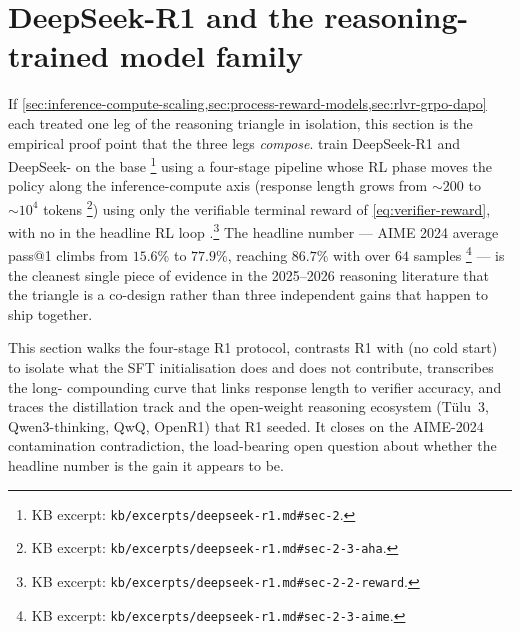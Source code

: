 
\section{DeepSeek-R1 and the reasoning-trained model family}
\label{sec:r1-family}
\label{sec:r1-protocol}

If \cref{sec:inference-compute-scaling,sec:process-reward-models,sec:rlvr-grpo-dapo}
each treated one leg of the reasoning triangle in isolation, this
section is the empirical proof point that the three legs
\emph{compose}. \citet{deepseek-r1} train DeepSeek-R1 and DeepSeek-
on the  base \citep[\S 2]{deepseek-r1}\footnote{KB excerpt:
\texttt{kb/excerpts/deepseek-r1.md\#sec-2}.} using a four-stage
pipeline whose RL phase moves the policy along the inference-compute
axis (response length grows from $\sim\!200$ to $\sim\!10^4$ tokens
\citep[\S 2.3]{deepseek-r1}\footnote{KB excerpt:
\texttt{kb/excerpts/deepseek-r1.md\#sec-2-3-aha}.}) using only the
verifiable terminal reward of \cref{eq:verifier-reward}, with no 
in the headline RL loop \citep[\S
2.2]{deepseek-r1}.\footnote{KB excerpt:
\texttt{kb/excerpts/deepseek-r1.md\#sec-2-2-reward}.} The headline
number --- AIME 2024 average pass@1 climbs from $15.6\%$ to $77.9\%$,
reaching $86.7\%$ with  over $64$ samples
\citep[\S 2.3]{deepseek-r1}\footnote{KB excerpt:
\texttt{kb/excerpts/deepseek-r1.md\#sec-2-3-aime}.} --- is the
cleanest single piece of evidence in the 2025--2026 reasoning literature
that the triangle is a co-design rather than three independent gains
that happen to ship together.

This section walks the four-stage R1 protocol, contrasts R1 with
 (no cold start) to isolate what the SFT initialisation does
and does not contribute, transcribes the long- compounding curve
that links response length to verifier accuracy, and traces the
distillation track and the open-weight reasoning ecosystem (Tülu~3,
Qwen3-thinking, QwQ, OpenR1) that R1 seeded. It closes on the
AIME-2024 contamination contradiction, the load-bearing open question
about whether the headline number is the gain it appears to be.

